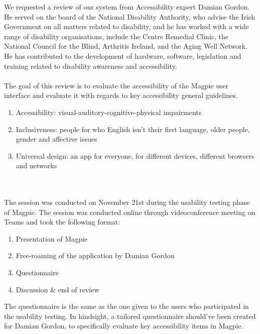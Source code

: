 We requested a review of our system from Accessibility expert Damian Gordon. He served on the board of the National Disability Authority, who advise the Irish Government on all matters related to disability, and he has worked with a wide range of disability organisations, include the Centre Remedial Clinic, the National Council for the Blind, Arthritis Ireland, and the Aging Well Network. He has contributed to the development of hardware, software, legislation and training related to disability awareness and accessibility. \\\\
The goal of this review is to evaluate the accessibility of the Magpie user interface and evaluate it with regards to key accessibility general guidelines.
\begin{enumerate}
    \item Accessibility: visual-auditory-cognitive-physical impairments
    \item Inclusiveness: people for who English isn't their first language, older people, gender and affective issues
    \item Universal design: an app for everyone, for different devices, different browsers and networks
\end{enumerate}
 \\\\

The session was conducted on November 21st during the usability testing phase of Magpie. The session was conducted online through videoconference meeting on Teams and took the following format:
\begin{enumerate}
    \item Presentation of Magpie
    \item Free-roaming of the application by Damian Gordon
    \item Questionnaire
    \item Discussion \& end of review
\end{enumerate}
The questionnaire is the same as the one given to the users who participated in the usability testing. In hindsight, a tailored questionnaire should've been created for Damian Gordon, to specifically evaluate key accessibility items in Magpie.
